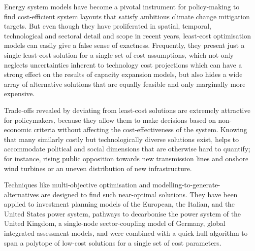
Energy system models have become a pivotal instrument for policy-making to find
cost-efficient system layouts that satisfy ambitious climate change mitigation
targets. But even though they have proliferated in spatial, temporal,
technological and sectoral detail and scope in recent years, least-cost
optimisation models can easily give a false sense of
exactness.\cite{Trutnevyte2016, pye_modelling_2020} Frequently, they present
just a single least-cost solution for a single set of cost assumptions, which
not only neglects uncertainties inherent to technology cost projections which
can have a strong effect on the results of capacity expansion models,
\cite{trondle_trade-offs_2020, yue_review_2018, pye_assessing_2018} but also
hides a wide array of alternative solutions that are equally feasible and only
marginally more expensive.\cite{nearoptimal, lombardi_policy_2020,
sasse_regional_2020}


Trade-offs revealed by deviating from least-cost solutions are extremely
attractive for policymakers, because they allow them to make decisions based on
non-economic criteria without affecting the cost-effectiveness of the system.
Knowing that many similarly costly but technologically diverse solutions exist,
helps to accommodate political and social dimensions that are otherwise hard to
quantify; for instance, rising public opposition towards new transmission
lines and onshore wind turbines or an uneven distribution of new infrastructure.
\cite{mccollum_energy_2020,sasse_regional_2020,schlachtberger_cost_2018}


Techniques like multi-objective optimisation and
modelling-to-generate-alternatives are designed to find such near-optimal
solutions. They have been applied to investment planning models of
the European,\cite{nearoptimal} the Italian,
\cite{lombardi_policy_2020} and the United States power system,
\cite{DeCarolis2016} pathways to decarbonise the power system of the United
Kingdom,\cite{Li2017} a single-node sector-coupling model of Germany,
\cite{nacken_integrated_2019} global integrated assessment models,
\cite{Price2017} and were combined with a quick hull algorithm to span a
polytope of low-cost solutions for a single set of cost parameters.\cite{pedersen_modeling_2020}


